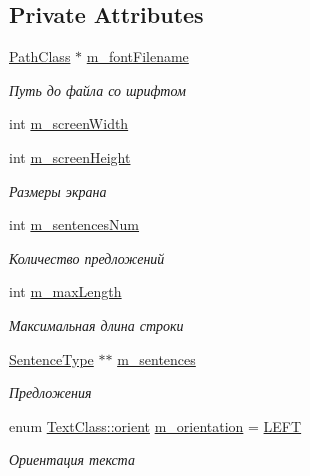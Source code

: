 \subsection*{Private Attributes}
\begin{DoxyCompactItemize}
\item 
\hyperlink{class_path_class}{Path\+Class} $\ast$ \hyperlink{class_text_class_afae6d2ce0305b5b54d89e860bea616f3}{m\+\_\+font\+Filename}
\begin{DoxyCompactList}\small\item\em Путь до файла со шрифтом \end{DoxyCompactList}\item 
int \hyperlink{class_text_class_a65b0b64aefdc5e02b53843f71a64f951}{m\+\_\+screen\+Width}
\item 
int \hyperlink{class_text_class_afca8feebcef3384910cdd306639d0f64}{m\+\_\+screen\+Height}
\begin{DoxyCompactList}\small\item\em Размеры экрана \end{DoxyCompactList}\item 
int \hyperlink{class_text_class_a848c8fd97aa51f5d1f1a6c7beb1f0107}{m\+\_\+sentences\+Num}
\begin{DoxyCompactList}\small\item\em Количество предложений \end{DoxyCompactList}\item 
int \hyperlink{class_text_class_a3e97ea09118661e949a18d22c369f6de}{m\+\_\+max\+Length}
\begin{DoxyCompactList}\small\item\em Максимальная длина строки \end{DoxyCompactList}\item 
\hyperlink{struct_text_class_1_1_sentence_type}{Sentence\+Type} $\ast$$\ast$ \hyperlink{class_text_class_a4b3d8d873f8b8a7371e8baf2dbcfe9d3}{m\+\_\+sentences}
\begin{DoxyCompactList}\small\item\em Предложения \end{DoxyCompactList}\item 
enum \hyperlink{class_text_class_ae51cf75f517ece3d3ab028aa9db47531}{Text\+Class\+::orient} \hyperlink{class_text_class_a804c46cd703b060e40f9de751f87ea50}{m\+\_\+orientation} = \hyperlink{class_text_class_ae51cf75f517ece3d3ab028aa9db47531a23dab4c79876766ff5cb02993e6cc490}{L\+E\+FT}
\begin{DoxyCompactList}\small\item\em Ориентация текста \end{DoxyCompactList}\end{DoxyCompactItemize}


